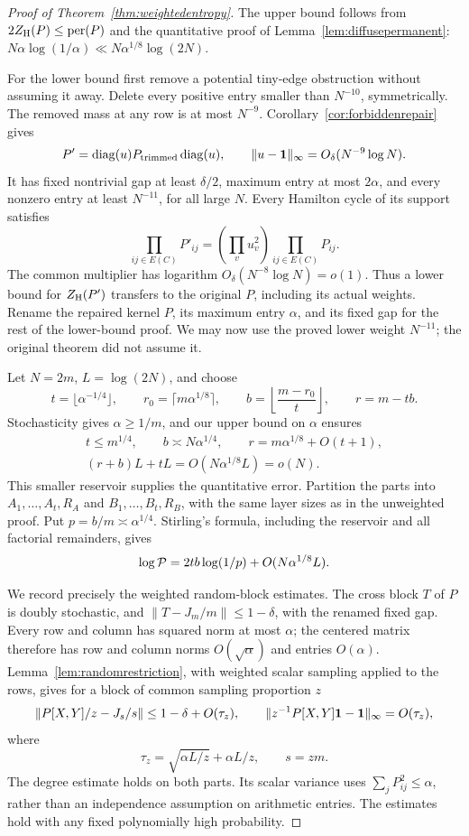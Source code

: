 \begin{proof}[Proof of Theorem~\ref{thm:weightedentropy}]
The upper bound follows from
\(2Z_{\rm H}(P)\leq\operatorname{per}(P)\) and the quantitative
proof of Lemma~\ref{lem:diffusepermanent}:
\(N\alpha\log(1/\alpha)\ll N\alpha^{1/8}\log(2N)\).

For the lower bound first remove a potential tiny-edge
obstruction without assuming it away.
Delete every positive entry smaller than \(N^{-10}\),
symmetrically. The removed mass at any row is at most \(N^{-9}\).
Corollary~\ref{cor:forbiddenrepair} gives
\[
 P'=\operatorname{diag}(u)P_{\rm trimmed}\operatorname{diag}(u),\qquad
 \|u-\mathbf1\|_\infty=O_\delta(N^{-9}\log N).
\]
It has fixed nontrivial gap at least \(\delta/2\), maximum
entry at most \(2\alpha\), and every nonzero entry at least
\(N^{-11}\), for all large \(N\).
Every Hamilton cycle of its support satisfies
\[
 \prod_{ij\in E(C)}P'_{ij}
       =\left(\prod_vu_v^2\right)
                       \prod_{ij\in E(C)}P_{ij}.
\]
The common multiplier has logarithm
\(O_\delta(N^{-8}\log N)=o(1)\).
Thus a lower bound for \(Z_{\rm H}(P')\) transfers to the
original \(P\), including its actual weights.
Rename the repaired kernel \(P\), its maximum entry \(\alpha\),
and its fixed gap for the rest of the lower-bound proof.
We may now use the proved lower weight \(N^{-11}\);
the original theorem did not assume it.

Let \(N=2m\), \(L=\log(2N)\), and choose
\[
 t=\lfloor\alpha^{-1/4}\rfloor,\qquad
 r_0=\lceil m\alpha^{1/8}\rceil,\qquad
 b=\left\lfloor\frac{m-r_0}{t}\right\rfloor,\qquad r=m-tb.
\]
Stochasticity gives \(\alpha\geq1/m\), and our upper bound
on \(\alpha\) ensures
\[
 \begin{gathered}
 t\leq m^{1/4},\qquad b\asymp N\alpha^{1/4},\qquad
 r=m\alpha^{1/8}+O(t+1),\\
 (r+b)L+tL=O(N\alpha^{1/8}L)=o(N).
 \end{gathered}
\]
This smaller reservoir supplies the quantitative error.
Partition the parts into
\(A_1,\ldots,A_t,R_A\) and \(B_1,\ldots,B_t,R_B\),
with the same layer sizes as in the unweighted proof.
Put \(p=b/m\asymp\alpha^{1/4}\).
Stirling's formula, including the reservoir and all factorial
remainders, gives
\[
 \log{\cal P}
   =2tb\log(1/p)+O(N\alpha^{1/8}L).
\]

We record precisely the weighted random-block estimates.
The cross block \(T\) of \(P\) is doubly stochastic, and
\(\|T-J_m/m\|\leq1-\delta\), with the renamed fixed gap.
Every row and column has squared norm at most \(\alpha\);
the centered matrix therefore has row and column norms
\(O(\sqrt\alpha)\) and entries \(O(\alpha)\).
Lemma~\ref{lem:randomrestriction}, with weighted scalar
sampling applied to the rows, gives for a block of common
sampling proportion \(z\)
\[
 \left\|P[X,Y]/z-J_s/s\right\|
       \leq1-\delta+O(\tau_z),\qquad
 \|z^{-1}P[X,Y]\mathbf1-\mathbf1\|_\infty=O(\tau_z),
\]
where
\[
 \tau_z=\sqrt{\alpha L/z}+\alpha L/z,\qquad s=zm.
\]
The degree estimate holds on both parts.
Its scalar variance uses \(\sum_jP_{ij}^2\leq\alpha\),
rather than an independence assumption on arithmetic entries.
The estimates hold with any fixed polynomially high probability.


\end{proof}

